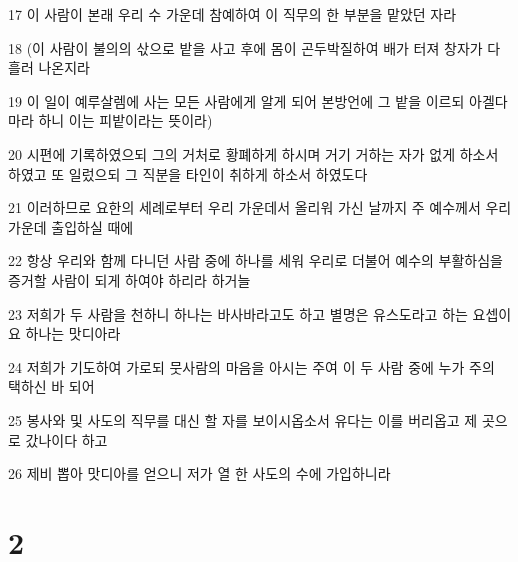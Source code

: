 \par 17 이 사람이 본래 우리 수 가운데 참예하여 이 직무의 한 부분을 맡았던 자라
\par 18 (이 사람이 불의의 삯으로 밭을 사고 후에 몸이 곤두박질하여 배가 터져 창자가 다 흘러 나온지라
\par 19 이 일이 예루살렘에 사는 모든 사람에게 알게 되어 본방언에 그 밭을 이르되 아겔다마라 하니 이는 피밭이라는 뜻이라)
\par 20 시편에 기록하였으되 그의 거처로 황폐하게 하시며 거기 거하는 자가 없게 하소서 하였고 또 일렀으되 그 직분을 타인이 취하게 하소서 하였도다
\par 21 이러하므로 요한의 세례로부터 우리 가운데서 올리워 가신 날까지 주 예수께서 우리 가운데 출입하실 때에
\par 22 항상 우리와 함께 다니던 사람 중에 하나를 세워 우리로 더불어 예수의 부활하심을 증거할 사람이 되게 하여야 하리라 하거늘
\par 23 저희가 두 사람을 천하니 하나는 바사바라고도 하고 별명은 유스도라고 하는 요셉이요 하나는 맛디아라
\par 24 저희가 기도하여 가로되 뭇사람의 마음을 아시는 주여 이 두 사람 중에 누가 주의 택하신 바 되어
\par 25 봉사와 및 사도의 직무를 대신 할 자를 보이시옵소서 유다는 이를 버리옵고 제 곳으로 갔나이다 하고
\par 26 제비 뽑아 맛디아를 얻으니 저가 열 한 사도의 수에 가입하니라

\chapter{2}

